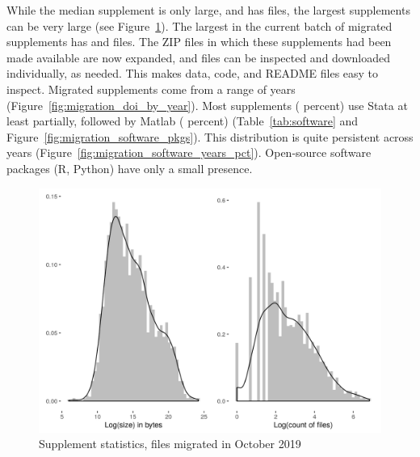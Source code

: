 \documentclass[PP]{AEA}
\begin{document}
While the median  supplement is only \nummediansizeMB{} large, and has \nummedianfilecount{} files, the largest supplements can be very large (see Figure~\ref{fig:migration_files}).  The largest in the current batch of migrated supplements has \nummaxsizeMB{} and \nummaxfilecount{} files. The ZIP files in which these supplements had been made available are now expanded, and files can be inspected and downloaded individually, as needed. This makes  data, code, and README files easy to inspect. Migrated supplements come from a range of years (Figure~\ref{fig:migration_doi_by_year}). Most supplements (\numsupplementsstatapct{} percent) use Stata at least partially, followed by Matlab (\numsupplementsmatlabpct{} percent) (Table~\ref{tab:software} and Figure~\ref{fig:migration_software_pkgs}). This distribution is quite persistent across years (Figure~\ref{fig:migration_software_years_pct}). Open-source software packages (R, Python) have only a small presence.

\begin{figure}
    \centering
    \includegraphics[height=0.4\textheight]{images/figure_migration_files.png}
    \caption{Supplement statistics, files migrated in October 2019}
    \label{fig:migration_files}
\end{figure}
\end{document}
